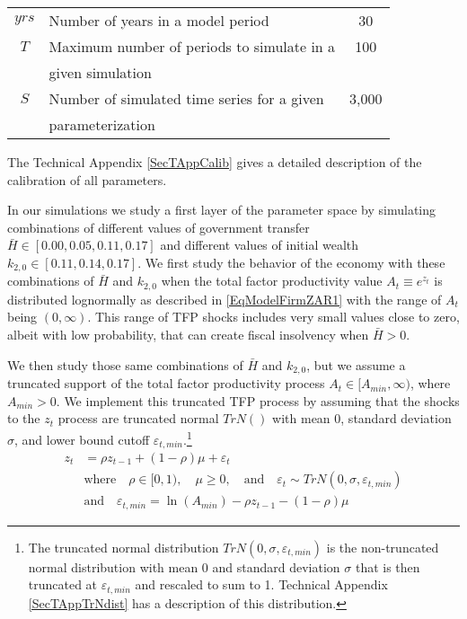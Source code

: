 \documentclass[letterpaper,12pt]{article}
\theoremstyle{definition}
\newcommand\ve{\varepsilon}
\begin{document}
\begin{spacing}{1.5}
\begin{table}[htbp]
\begin{threeparttable}
\begin{tabular}{>{\small}c >{\small}l >{\small}c}
          $yrs$ & Number of years in a model period & 30 \\
          $T$ & Maximum number of periods to simulate in a & 100 \\
              & \quad given simulation & \\
          $S$ & Number of simulated time series for a given & 3,000 \\
              & \quad parameterization & \\
          \hline\hline
      \end{tabular}
      \begin{tablenotes}
          \scriptsize{\item[]The Technical Appendix \ref{SecTAppCalib} gives a detailed description of the calibration of all parameters.}
      \end{tablenotes}
      \end{threeparttable}
  \end{table}

  In our simulations we study a first layer of the parameter space by simulating combinations of different values of government transfer $\bar{H}\in[0.00, 0.05, 0.11, 0.17]$ and different values of initial wealth $k_{2,0}\in[0.11, 0.14, 0.17]$. We first study the behavior of the economy with these combinations of $\bar{H}$ and $k_{2,0}$ when the total factor productivity value $A_t\equiv e^{z_t}$ is distributed lognormally as described in \eqref{EqModelFirmZAR1} with the range of $A_t$ being $(0,\infty)$. This range of TFP shocks includes very small values close to zero, albeit with low probability, that can create fiscal insolvency when $\bar{H}>0$.

  We then study those same combinations of $\bar{H}$ and $k_{2,0}$, but we assume a truncated support of the total factor productivity process $A_t\in[A_{min},\infty)$, where $A_{min}>0$. We implement this truncated TFP process by assuming that the shocks to the $z_t$ process are truncated normal $TrN()$ with mean 0, standard deviation $\sigma$, and lower bound cutoff $\ve_{t,min}$.\footnote{The truncated normal distribution $TrN(0,\sigma, \ve_{t,min})$ is the non-truncated normal distribution with mean 0 and standard deviation $\sigma$ that is then truncated at $\ve_{t,min}$ and rescaled to sum to 1. Technical Appendix \ref{SecTAppTrNdist} has a description of this distribution.}
  \begin{equation}\label{EqSimsZAR1_trunc}
    \begin{split}
      z_t &= \rho z_{t-1} + (1-\rho)\mu + \ve_t \\
      &\text{where}\quad \rho\in[0,1),\quad\mu\geq 0, \quad\text{and}\quad \ve_t \sim TrN(0,\sigma, \ve_{t,min}) \\
      &\text{and}\quad \ve_{t,min} = \ln(A_{min}) - \rho z_{t-1} - (1 - \rho)\mu
    \end{split}
  \end{equation}


\end{spacing}
\end{document}
